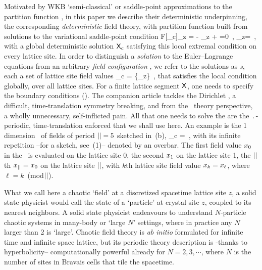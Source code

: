 Motivated by WKB `semi-classical' or saddle-point
approximations to the partition function ,
in this paper we describe their deterministic underpinning, the corresponding
\emph{deterministic} field theory, with partition function built from
solutions to the variational saddle-point condition
\beq
F[\Xx_c]_z =
- \action[\Xx_c]_z +  =0
\,,\qquad
\action[\Xx]_z=
\,,
with a global deterministic solution $\mathsf{X}_c$ satisfying this local extremal
condition on every lattice site.
In order to distinguish a \emph{solution} to the Euler–Lagrange equations
 from an {arbitrary} \emph{field configuration}
, we refer to the solutions as
\emph{{\lattstate}s}, each a set of lattice site field values
\beq
\Xx_c = \{\ssp_z\}
\,,
\label{1dLattStat}
\eeq
that satisfies the local {condition}  globally,
over all lattice sites.
For a finite lattice segment $\mathsf{X}$, one needs to specify the boundary
conditions ({\bcs}).
The companion article  tackles the Dirichlet {\bcs}, a
difficult, time-translation symmetry breaking, and from the \po\ theory
perspective, a wholly unnecessary, self-inflicted pain. All that one
needs to solve the {\templatt} are the $\period{}$-periodic,
time-translation enforced {\bcs} that we shall use here.
An example is the 1 {\spt} dimension \brick\ of fields of period
${||}=5$ sketched in \,(b),
\beq
\Xx_c = 
\,,
with its infinite repetition --for a sketch, see
\,(1)-- denoted by an overbar.
The first field value $x_0$ in the \brick\ is evaluated on the lattice site 0,
the second $x_1$ on the lattice site 1,
the ${||}$th $x_{{||}}=x_0$ on the lattice site ${||}$,
with $k$th lattice site field value $x_{k}=x_{\ell}$,
where $\ell=k$~(mod${||}$).

What we call here a chaotic `field' at a discretized spacetime lattice
site $z$, a solid state physicist would call the state of a `particle' at
crystal site $z$, coupled to its nearest neighbors. A solid state
physicist endeavours to understand $N$-particle chaotic systems in
many-body or `large $N$' settings, where in practice any $N$ larger than 2
is `large'. Chaotic field theory is {\em ab initio} formulated for infinite
time and infinite space lattice, but its periodic theory description is
-thanks to hyperbolicity-- computationally powerful already for $N=2, 3,
\cdots$, where $N$ is the number of sites in Bravais cells that tile the
spacetime.

